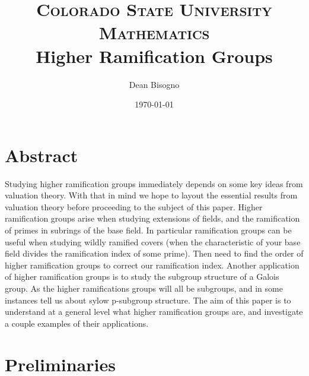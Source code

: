 \documentclass[paper=a4, fontsize=11pt]{scrartcl} %
\title{	
\normalfont \normalsize 
\textsc{Colorado State University Mathematics} \\ [25pt] %
\huge Higher Ramification Groups \\ %
}
\author{Dean Bisogno} %
\date{\normalsize\today} %
\numberwithin{equation}{section} %
\numberwithin{figure}{section} %
\numberwithin{table}{section} %
\theoremstyle{break}
\begin{document}
\maketitle %
\section{Abstract}
Studying higher ramification groups immediately depends on some key ideas from valuation theory. With that in mind we hope to layout the essential results from valuation theory before proceeding to the subject of this paper. Higher ramification groups arise when studying extensions of fields, and the ramification of primes in subrings of the base field. In particular ramification groups can be useful when studying wildly ramified covers (when the characteristic of your base field divides the ramification index of some prime). Then need to find the order of higher ramification groups to correct our ramification index. Another application of higher ramification groups is to study the subgroup structure of a Galois group. As the higher ramifications groups will all be subgroups, and in some instances tell us about sylow p-subgroup structure. The aim of this paper is to understand at a general level what higher ramification groups are, and investigate a couple examples of their applications.
\section{Preliminaries}
\end{document}
